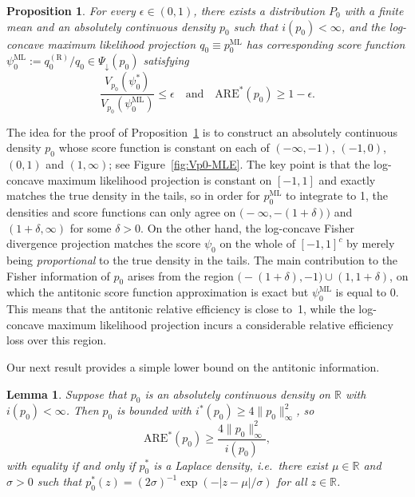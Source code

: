 \documentclass[a4paper]{article}
\newcommand{\R}{\mathbb{R}}
\newcommand{\norm}[1]{\|{#1}\|}
\newtheorem{lemma}[theorem]{Lemma}
\newtheorem{proposition}[theorem]{Proposition}
\theoremstyle{definition}
\begin{document}
\begin{proposition}
\label{prop:Vp0-MLE}
For every $\epsilon \in (0,1)$, there exists a distribution $P_0$ with a finite mean and an absolutely continuous density $p_0$ such that $i(p_0) < \infty$, and the log-concave maximum likelihood projection $q_0 \equiv p_0^{\mathrm{ML}}$ has corresponding score function $\psi_0^{\mathrm{ML}} := q_0^{(\mathrm{R})}/q_0 \in \Psi_\downarrow(p_0)$ satisfying
\begin{equation}
\label{eq:Vp0-MLE}
\frac{V_{p_0}(\psi_0^*)}{V_{p_0}(\psi_0^{\mathrm{ML}})} \leq \epsilon \quad\text{and}\quad \mathrm{ARE}^*(p_0) \geq 1 - \epsilon.
\end{equation}
\end{proposition}
The idea for the proof of Proposition~\ref{prop:Vp0-MLE} is to construct an absolutely continuous density $p_0$ whose score function is constant on each of $(-\infty,-1)$, $(-1,0)$, $(0,1)$ and $(1,\infty)$; see Figure~\ref{fig:Vp0-MLE}. The key point is that the log-concave maximum likelihood projection is constant on $[-1,1]$ and exactly matches the true density in the tails, so in order for $p_0^{\mathrm{ML}}$ to integrate to 1,  the densities and score functions can only agree on $\bigl(-\infty,-(1+\delta)\bigr)$ and $(1+\delta,\infty)$ for some $\delta > 0$. On the other hand, the log-concave Fisher divergence projection matches the score $\psi_0$ on the whole of $[-1,1]^c$ by merely being \emph{proportional} to the true density in the tails. The main contribution to the Fisher information of $p_0$ arises from the region $\bigl(-(1+\delta), -1\bigr) \cup (1, 1+\delta)$, on which the antitonic score function approximation is exact but $\psi_0^{\mathrm{ML}}$ is equal to 0. This means that the antitonic relative efficiency is close to~1, while the log-concave maximum likelihood projection incurs a considerable relative efficiency loss over this region.

Our next result provides a simple lower bound on the antitonic information.
\begin{lemma}
\label{lem:ARE-lower-bound}
Suppose that $p_0$ is an absolutely continuous density on $\R$ with $i(p_0) < \infty$. Then $p_0$ is bounded with $i^*(p_0) \geq 4\norm{p_0}_\infty^2$, so
\[
\mathrm{ARE}^*(p_0) \geq \frac{4\norm{p_0}_\infty^2}{i(p_0)},
\]
with equality if and only if $p_0^*$ is a Laplace density, i.e.~there exist $\mu \in \R$ and $\sigma > 0$ such that $p_0^*(z) = (2\sigma)^{-1}\exp(-|z - \mu|/\sigma)$ for all $z \in \R$.
\end{lemma}
\end{document}
